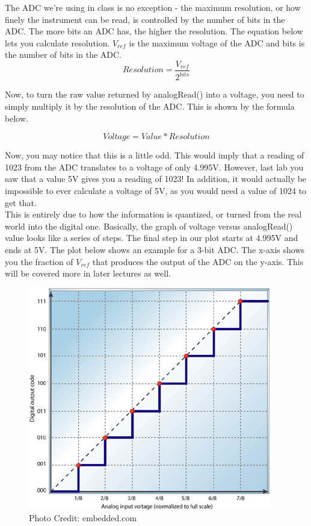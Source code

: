 \documentclass[12pt]{article}
\begin{document}
	The ADC we're using in class is no exception - the maximum resolution, or how finely the instrument can be read, is controlled by the number of bits in the ADC. The more bits an ADC has, the higher the resolution. The equation below lets you calculate resolution. $V_{ref}$ is the maximum voltage of the ADC and bits is the number of bits in the ADC.
	$$ Resolution = \frac{V_{ref}}{2^{bits}} $$ 
	
    Now, to turn the raw value returned by analogRead() into a voltage, you need to simply multiply it by the resolution of the ADC. This is shown by the formula below.
    
    $$ Voltage = Value * Resolution $$
    
    Now, you may notice that this is a little odd. This would imply that a reading of 1023 from the ADC translates to a voltage of only 4.995V. However, last lab you saw that a value 5V gives you a reading of 1023! In addition, it would actually be impossible to ever calculate a voltage of 5V, as you would need a value of 1024 to get that.
    \\
      
    This is entirely due to how the information is quantized, or turned from the real world into the digital one. Basically, the graph of voltage versus analogRead() value looks like a series of steps. The final step in our plot starts at 4.995V and ends at 5V. The plot below shows an example for a 3-bit ADC. The x-axis shows you the fraction of $V_{ref}$ that produces the output of the ADC on the y-axis. This will be covered more in later lectures as well.
    
	\begin{figure}[h]
	\begin{center}
			\includegraphics[scale = 0.6]{Figures/ADCplot.png}
			\caption{Photo Credit: embedded.com}
		\end{center}
	\end{figure}
    
\end{document}
